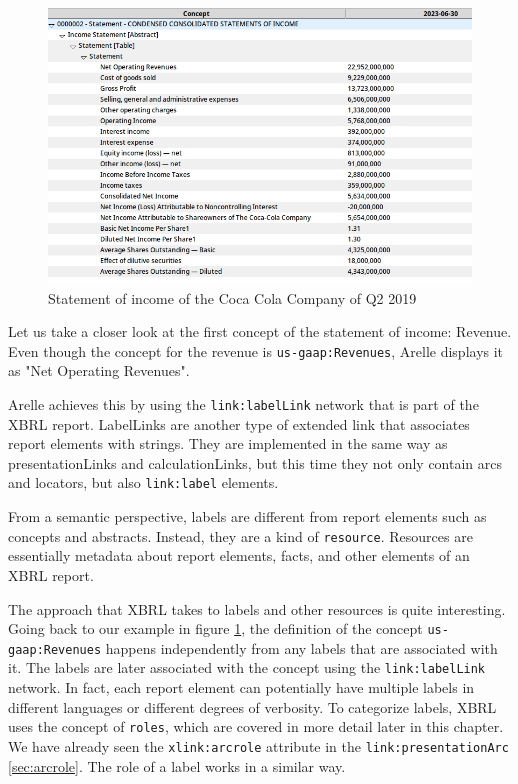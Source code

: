 \begin{figure}[H]
    \centering
    \includegraphics[width=\textwidth]{images/coca_cola_2019_q2.png}
    \caption{Statement of income of the Coca Cola Company of Q2 2019}
    \label{fig:coca_cola_2019_q2}
\end{figure}

Let us take a closer look at the first concept of the statement of income: Revenue.
Even though the concept for the revenue is \texttt{us-gaap:Revenues}, Arelle displays it as "Net Operating Revenues".

Arelle achieves this by using the \texttt{link:labelLink} network that is part of the XBRL report. 
LabelLinks are another type of extended link that associates report elements with strings.
They are implemented in the same way as presentationLinks and calculationLinks, but this time they not only contain arcs and locators, but also \texttt{link:label} elements.

From a semantic perspective, labels are different from report elements such as concepts and abstracts.
Instead, they are a kind of \texttt{resource}.
Resources are essentially metadata about report elements, facts, and other elements of an XBRL report.

The approach that XBRL takes to labels and other resources is quite interesting.
Going back to our example in figure \ref{fig:coca_cola_2019_q2}, the definition of the concept \texttt{us-gaap:Revenues} happens independently from any labels that are associated with it.
The labels are later associated with the concept using the \texttt{link:labelLink} network.
In fact, each report element can potentially have multiple labels in different languages or different degrees of verbosity.
To categorize labels, XBRL uses the concept of \texttt{roles}, which are covered in more detail later in this chapter.
We have already seen the \texttt{xlink:arcrole} attribute in the \texttt{link:presentationArc} \ref{sec:arcrole}.
The role of a label works in a similar way.

